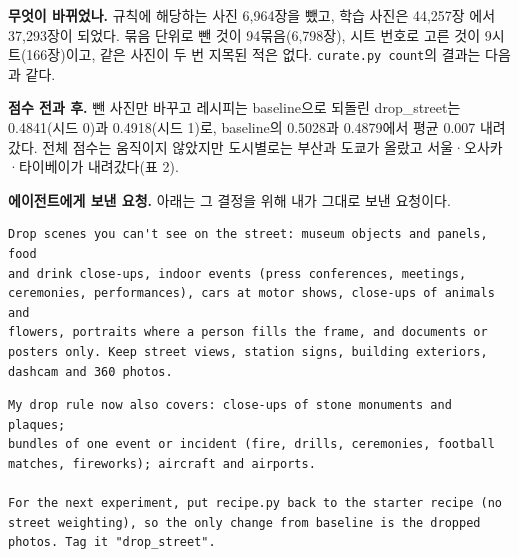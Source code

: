 \documentclass[11pt]{article}
\begin{document}

\textbf{무엇이 바뀌었나.} 규칙에 해당하는 사진 6,964장을 뺐고, 학습 사진은 44,257장
에서 37,293장이 되었다. 묶음 단위로 뺀 것이 94묶음(6,798장), 시트 번호로 고른 것이
9시트(166장)이고, 같은 사진이 두 번 지목된 적은 없다. \texttt{curate.py count}의
결과는 다음과 같다.


\textbf{점수 전과 후.} 뺀 사진만 바꾸고 레시피는 baseline으로 되돌린
drop\_street는 0.4841(시드 0)과 0.4918(시드 1)로, baseline의 0.5028과 0.4879에서
평균 0.007 내려갔다. 전체 점수는 움직이지 않았지만 도시별로는 부산과 도쿄가 올랐고
서울·오사카·타이베이가 내려갔다(표 2).

\textbf{에이전트에게 보낸 요청.} 아래는 그 결정을 위해 내가 그대로 보낸 요청이다.

\begin{Verbatim}[fontsize=\footnotesize, breaklines, breakanywhere, frame=single, framesep=2mm]
Drop scenes you can't see on the street: museum objects and panels, food
and drink close-ups, indoor events (press conferences, meetings,
ceremonies, performances), cars at motor shows, close-ups of animals and
flowers, portraits where a person fills the frame, and documents or
posters only. Keep street views, station signs, building exteriors,
dashcam and 360 photos.
\end{Verbatim}

\begin{Verbatim}[fontsize=\footnotesize, breaklines, breakanywhere, frame=single, framesep=2mm]
My drop rule now also covers: close-ups of stone monuments and plaques;
bundles of one event or incident (fire, drills, ceremonies, football
matches, fireworks); aircraft and airports.

For the next experiment, put recipe.py back to the starter recipe (no
street weighting), so the only change from baseline is the dropped
photos. Tag it "drop_street".
\end{Verbatim}
\end{document}
